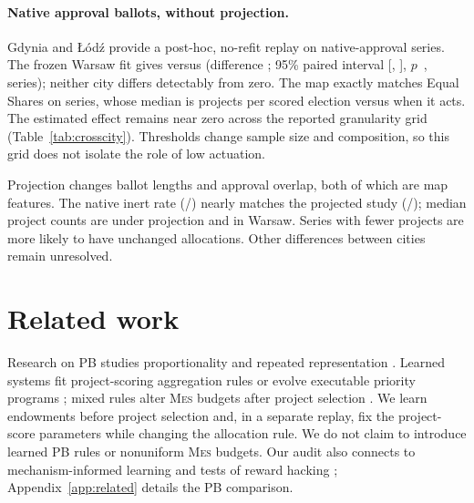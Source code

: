 \documentclass{article}
\newcommand{\MES}{\textsc{Mes}}
\begin{document}
\paragraph{Native approval ballots, without projection.}
Gdynia and \L{}\'od\'z provide a post-hoc, no-refit replay on
\CrossCitySeriesN{} native-approval series. The frozen Warsaw fit gives
\CrossCityAllLearned{} versus \CrossCityAllMES{} (difference
\CrossCityAllDiff{}; 95\% paired interval [\CrossCityAllCILow{},
\CrossCityAllCIHigh{}], $p$~\CrossCityAllP{}, \CrossCityAllWins{} series);
neither city differs detectably from zero. The map exactly matches Equal Shares
on \CrossCityInertN{} series, whose median is
\CrossCityMedianProjectsInert{} projects per scored election versus
\CrossCityMedianProjectsActive{} when it acts. The estimated effect remains
near zero across the reported granularity grid (Table~\ref{tab:crosscity}).
Thresholds change sample size and composition, so this grid does not isolate
the role of low actuation.

Projection changes ballot lengths and approval overlap, both of which are map features. The
native inert rate (\CrossCityInertN{}/\CrossCityAllSeriesN{}) nearly matches the
projected study (\ActuatingInert{}/\ExternalSeriesN{}); median project counts
are \ExternalMedianProjects{} under projection and \WarsawMedianProjects{} in
Warsaw. Series with fewer projects are more likely to have unchanged
allocations. Other differences between cities remain unresolved.

\section{Related work}
\label{sec:related}

Research on PB studies proportionality and repeated representation
\citep{aziz2015jr,peters2020welfarism,lackner2020perpetual,elkind2023temporal}.
Learned systems fit project-scoring aggregation rules
\citep{fairstein2024learningpb} or evolve executable priority programs
\citep{thach2026llmrule}; mixed rules alter \MES{} budgets after project
selection \citep{baychkov2026mixed}. We learn endowments before project
selection and, in a separate replay, fix the project-score parameters while
changing the allocation rule. We do not claim to introduce learned PB rules
or nonuniform \MES{} budgets. Our audit also connects to mechanism-informed learning
\citep{maruo2026mechanism} and tests of reward hacking
\citep{skalse2022defining}; Appendix~\ref{app:related} details the PB comparison.
\end{document}
